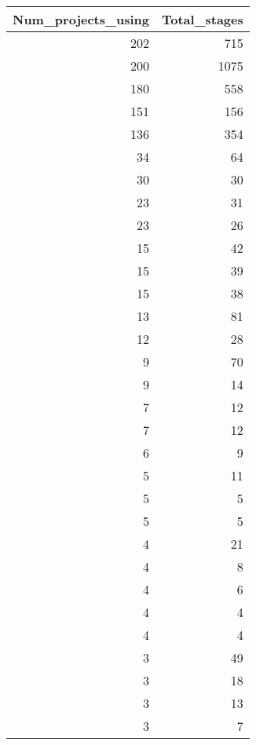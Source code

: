 \begin{tabular}{rr}
\toprule
 Num\_projects\_using &  Total\_stages \\
\midrule
                202 &           715 \\
                200 &          1075 \\
                180 &           558 \\
                151 &           156 \\
                136 &           354 \\
                 34 &            64 \\
                 30 &            30 \\
                 23 &            31 \\
                 23 &            26 \\
                 15 &            42 \\
                 15 &            39 \\
                 15 &            38 \\
                 13 &            81 \\
                 12 &            28 \\
                  9 &            70 \\
                  9 &            14 \\
                  7 &            12 \\
                  7 &            12 \\
                  6 &             9 \\
                  5 &            11 \\
                  5 &             5 \\
                  5 &             5 \\
                  4 &            21 \\
                  4 &             8 \\
                  4 &             6 \\
                  4 &             4 \\
                  4 &             4 \\
                  3 &            49 \\
                  3 &            18 \\
                  3 &            13 \\
                  3 &             7 \\

\end{tabular}
